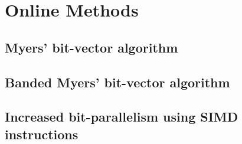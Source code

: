 \chapter{Online Methods}
\section{Myers' bit-vector algorithm}
\section{Banded Myers' bit-vector algorithm}
\section{Increased bit-parallelism using SIMD instructions}
